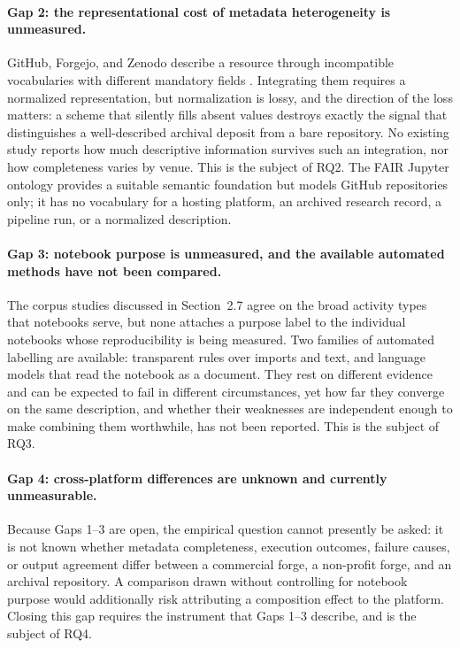 \paragraph{Gap 2: the representational cost of metadata heterogeneity is unmeasured.} GitHub, Forgejo, and Zenodo describe a resource through incompatible vocabularies with different mandatory fields \cite{githubapi,forgejoapi,zenodoapi}. Integrating them requires a normalized representation, but normalization is lossy, and the direction of the loss matters: a scheme that silently fills absent values destroys exactly the signal that distinguishes a well-described archival deposit from a bare repository. No existing study reports how much descriptive information survives such an integration, nor how completeness varies by venue. This is the subject of RQ2. The FAIR Jupyter ontology \cite{samuel2024fairjupyter} provides a suitable semantic foundation but models GitHub repositories only; it has no vocabulary for a hosting platform, an archived research record, a pipeline run, or a normalized description.

\paragraph{Gap 3: notebook purpose is unmeasured, and the available automated methods have not been compared.} The corpus studies discussed in Section~2.7 agree on the broad activity types that notebooks serve, but none attaches a purpose label to the individual notebooks whose reproducibility is being measured. Two families of automated labelling are available: transparent rules over imports and text, and language models that read the notebook as a document. They rest on different evidence and can be expected to fail in different circumstances, yet how far they converge on the same description, and whether their weaknesses are independent enough to make combining them worthwhile, has not been reported. This is the subject of RQ3.

\paragraph{Gap 4: cross-platform differences are unknown and currently unmeasurable.} Because Gaps 1--3 are open, the empirical question cannot presently be asked: it is not known whether metadata completeness, execution outcomes, failure causes, or output agreement differ between a commercial forge, a non-profit forge, and an archival repository. A comparison drawn without controlling for notebook purpose would additionally risk attributing a composition effect to the platform. Closing this gap requires the instrument that Gaps 1--3 describe, and is the subject of RQ4.

